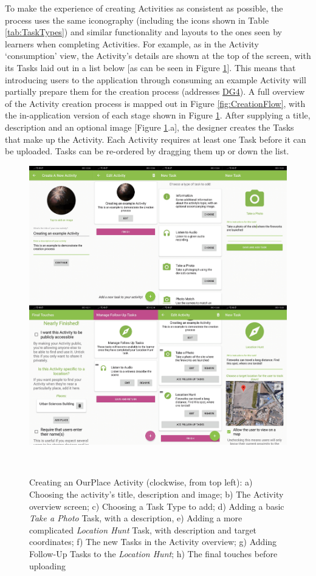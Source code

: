 To make the experience of creating Activities as consistent as possible, the process uses the same iconography (including the icons shown in Table \ref{tab:TaskTypes}) and similar functionality and layouts to the ones seen by learners when completing Activities. For example, as in the Activity `consumption' view, the Activity's details are shown at the top of the screen, with its Tasks laid out in a list below [as can be seen in Figure \ref{fig:ActivityCreation}]. This means that introducing users to the application through consuming an example Activity will partially prepare them for the creation process (addresses \hyperref[DG4]{DG4}). A full overview of the Activity creation process is mapped out in Figure \ref{fig:CreationFlow}, with the in-application version of each stage shown in Figure \ref{fig:ActivityCreation}. After supplying a title, description and an optional image [Figure \ref{fig:ActivityCreation}.a], the designer creates the Tasks that make up the Activity. Each Activity requires at least one Task before it can be uploaded. Tasks can be re-ordered by dragging them up or down the list.

\begin{figure}
  \centering
  \includegraphics[width=1\columnwidth]{images/chapter05/creation.png}
  \caption[Creating an Activity in OurPlace]{Creating an OurPlace Activity (clockwise, from top left): a) Choosing the activity's title, description and image; b) The Activity overview screen; c) Choosing a Task Type to add; d) Adding a basic \textit{Take a Photo} Task, with a description, e) Adding a more complicated \textit{Location Hunt} Task, with description and target coordinates; f) The new Tasks in the Activity overview; g) Adding Follow-Up Tasks to the \textit{Location Hunt}; h) The final touches before uploading }~\label{fig:ActivityCreation}
\end{figure}

